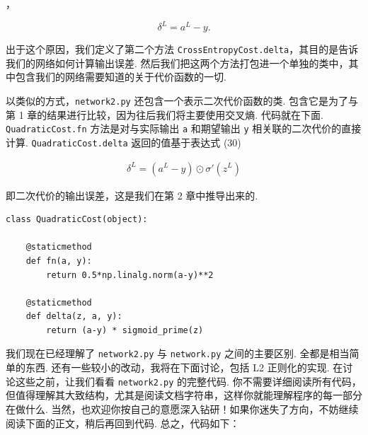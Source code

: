 \noindent，

\begin{equation}
\delta^L = a^L-y.
\tag{99}
\end{equation}

\noindent 出于这个原因，我们定义了第二个方法 \texttt{CrossEntropyCost.delta}，其目的是告诉我们的网络如何计算输出误差. 然后我们把这两个方法打包进一个单独的类中，其中包含我们的网络需要知道的关于代价函数的一切.

以类似的方式，\texttt{network2.py} 还包含一个表示二次代价函数的类. 包含它是为了与第 1 章的结果进行比较，因为往后我们将主要使用交叉熵. 代码就在下面. \texttt{QuadraticCost.fn} 方法是对与实际输出 \texttt{a} 和期望输出 \texttt{y} 相关联的二次代价的直接计算. \texttt{QuadraticCost.delta} 返回的值基于表达式 (30)

\begin{align*}
\delta^L = (a^L-y) \odot \sigma'(z^L) \nonumber
\end{align*}

\noindent 即二次代价的输出误差，这是我们在第 2 章中推导出来的.

\begin{lstlisting}
class QuadraticCost(object):

    @staticmethod
    def fn(a, y):
        return 0.5*np.linalg.norm(a-y)**2

    @staticmethod
    def delta(z, a, y):
        return (a-y) * sigmoid_prime(z)

\end{lstlisting}

我们现在已经理解了 \texttt{network2.py} 与 \texttt{network.py} 之间的主要区别. 全都是相当简单的东西. 还有一些较小的改动，我将在下面讨论，包括 L2 正则化的实现. 在讨论这些之前，让我们看看 \texttt{network2.py} 的完整代码. 你不需要详细阅读所有代码，但值得理解其大致结构，尤其是阅读文档字符串，这样你就能理解程序的每一部分在做什么. 当然，也欢迎你按自己的意愿深入钻研！如果你迷失了方向，不妨继续阅读下面的正文，稍后再回到代码. 总之，代码如下：


